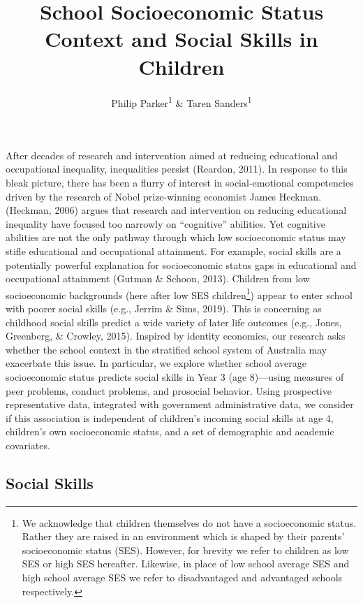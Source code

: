 \documentclass[
  english,
  man]{apa6}
\title{School Socioeconomic Status Context and Social Skills in Children}
\author{Philip Parker\textsuperscript{1} \& Taren Sanders\textsuperscript{1}}
\date{}
\affiliation{\vspace{0.5cm}\textsuperscript{1} Institute for Positive Psychology and Education, Australian Catholic University\\\textsuperscript{2} UCL Institute of Education, UCL}
\begin{document}
\maketitle

After decades of research and intervention aimed at reducing educational and occupational inequality, inequalities persist (Reardon, 2011). In response to this bleak picture, there has been a flurry of interest in social-emotional competencies driven by the research of Nobel prize-winning economist James Heckman. (Heckman, 2006) argues that research and intervention on reducing educational inequality have focused too narrowly on ``cognitive'' abilities. Yet cognitive abilities are not the only pathway through which low socioeconomic status may stifle educational and occupational attainment. For example, social skills are a potentially powerful explanation for socioeconomic status gaps in educational and occupational attainment (Gutman \& Schoon, 2013). Children from low socioeconomic backgrounds (here after low SES children\footnote{We acknowledge that children themselves do not have a socioeconomic status. Rather they are raised in an environment which is shaped by their parents' socioeconomic status (SES). However, for brevity we refer to children as low SES or high SES hereafter. Likewise, in place of low school average SES and high school average SES we refer to disadvantaged and advantaged schools respectively.}) appear to enter school with poorer social skills (e.g., Jerrim \& Sims, 2019). This is concerning as childhood social skills predict a wide variety of later life outcomes (e.g., Jones, Greenberg, \& Crowley, 2015). Inspired by identity economics, our research asks whether the school context in the stratified school system of Australia may exacerbate this issue. In particular, we explore whether school average socioeconomic status predicts social skills in Year 3 (age 8)---using measures of peer problems, conduct problems, and prosocial behavior. Using prospective representative data, integrated with government administrative data, we consider if this association is independent of children's incoming social skills at age 4, children's own socioeconomic status, and a set of demographic and academic covariates.

\hypertarget{social-skills}{%
\subsection{Social Skills}\label{social-skills}}
\end{document}
